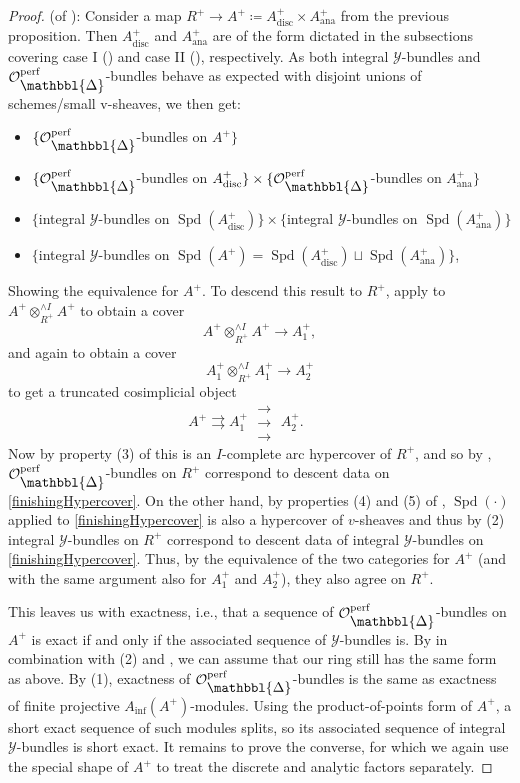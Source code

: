 \documentclass[10pt,twoside]{article}
\numberwithin{equation}{section}
\theoremstyle{plain}
\theoremstyle{definition}
\DeclareMathOperator{\Spd}{Spd}
\DeclareMathOperator{\ana}{ana}
\DeclareMathOperator{\disc}{disc}
\newcommand{\MCO}{\mathcal{O}}
\newcommand{\MCY}{\mathcal{Y}}
\DeclareMathOperator{\perf}{perf}
\newcommand{\Prism}{{\mathlarger{\mathbbl{\Delta}}}}
\DeclareMathOperator{\Inf}{inf}
\newcommand{\Ainf}{A_{\Inf}}
\newcommand{\OpP}{\MCO^{\perf}_{\Prism}}
\newcommand{\rrrarrows}{\;\substack{\rightarrow\\[-1em] \rightarrow \\[-1em] \rightarrow}\;}
\begin{document}
\begin{proof} (of ):
Consider a map \(R^+\to A^+\coloneqq A^+_{\disc} \times A^+_{\ana}\) from the previous proposition. Then \(A^+_{\disc}\) and \(A^+_{\ana}\) are of the form dictated in the subsections covering case I () and case II (), respectively. As both integral \(\MCY\)-bundles and \(\OpP\)-bundles behave as expected with disjoint unions of schemes/small v-sheaves, we then get:
\begin{itemize}
    \item[] \(\{\OpP\)-bundles on \(A^+\}\)
    \item[\(\cong\)] \(\{\OpP\)-bundles on \(A_{\disc}^+\}\times \{\OpP\)-bundles on \(A_{\ana}^+\}\) 
    \item[\(\cong\)] \(\{\)integral \(\MCY\)-bundles on \(\Spd(A_{\disc}^+)\}\times \{\)integral \(\MCY\)-bundles on \(\Spd(A_{\ana}^+)\}\) 
    \item[\(\cong\)] \(\{\)integral \(\MCY\)-bundles on \(\Spd(A^+)=\Spd(A_{\disc}^+)\sqcup \Spd(A^+_{\ana})\}\),
\end{itemize}
Showing the equivalence for \(A^+\). To descend this result to \(R^+\), apply  to \(A^+\otimes^{\wedge I}_{R^+}A^+\) to obtain a cover
\[A^+\otimes^{\wedge I}_{R^+}A^+\longrightarrow A_1^+,\]
and again to obtain a cover
\[A_1^+\otimes^{\wedge I}_{R^+}A_1^+\longrightarrow A_2^+\]
to get a truncated cosimplicial object
\begin{equation*}\tag{*}\label{finishingHypercover}
    A^+ \rightrightarrows A^+_1  \rrrarrows A^+_2. \qquad 
\end{equation*}
Now by property (3) of  this is an \(I\)-complete arc hypercover of \(R^+\), and so by , \(\OpP\)-bundles on \(R^+\) correspond to descent data on \eqref{finishingHypercover}. On the other hand, by properties (4) and (5) of , \(\Spd(\cdot)\) applied to \eqref{finishingHypercover} is also a hypercover of \(v\)-sheaves and thus by  (2) integral \(\MCY\)-bundles on \(R^+\) correspond to descent data of integral \(\MCY\)-bundles on \eqref{finishingHypercover}. Thus, by the equivalence of the two categories for \(A^+\) (and with the same argument also for \(A_1^+\) and \(A_2^+\)), they also agree on \(R^+\).\par
This leaves us with exactness, i.e., that a sequence of \(\OpP\)-bundles on \(A^+\) is exact if and only if the associated sequence of \(\MCY\)-bundles is. By  in combination with  (2) and , we can assume that our ring still has the same form as above. By  (1), exactness of \(\OpP\)-bundles is the same as exactness of finite projective \(\Ainf(A^+)\)-modules. Using the product-of-points form of \(A^+\), a short exact sequence of such modules splits, so its associated sequence of integral \(\MCY\)-bundles is short exact. It remains to prove the converse, for which we again use the special shape of \(A^+\) to treat the discrete and analytic factors separately.\par 

\end{proof}
\end{document}
